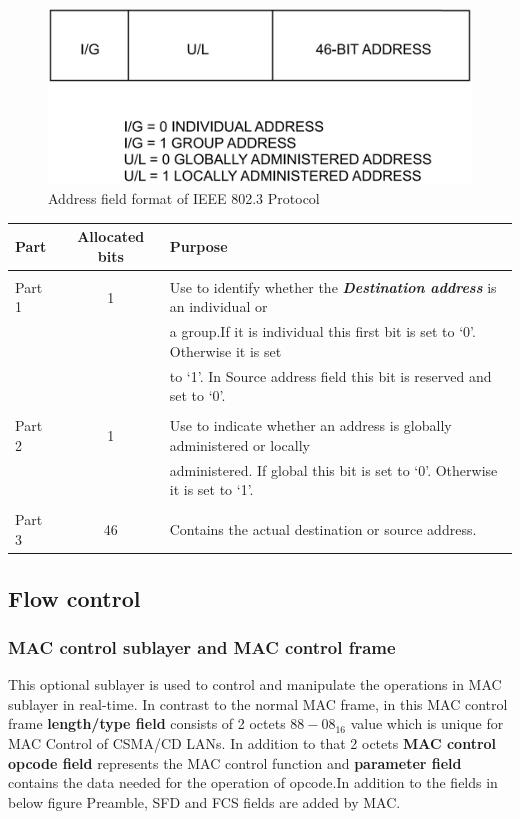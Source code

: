 \documentclass[a4paper,11pt]{article}%
\begin{document}
	\begin{figure}[!h]
		\centering
		\includegraphics[scale=0.2]{figures/addfield}
		\caption{Address field format of IEEE 802.3 Protocol\cite{main}}
	\end{figure}

	\begin{tabular}{l| c |l}
	\textbf{Part}& \textbf{Allocated bits} & \textbf{Purpose}\\ \hline
	&&\\
	  Part 1& 1& Use to identify whether the \textbf{\textit{Destination address}} is an individual or\\ 
	  	& &a group.If it is individual this first bit is set to `0'. Otherwise it is set\\
	  	&&to `1'. In Source address field this bit is reserved and set to `0'.\\
	  &&\\
	  Part 2& 1&Use to indicate whether an address is globally administered or locally\\
	  && administered. If global this bit is set to `0'. Otherwise it is set to `1'.\\
	  
	  &&\\
	  Part 3& 46& Contains the actual destination or source address.\\\hline\hline
\end{tabular}





\subsection{Flow control}

\subsubsection{MAC control sublayer and MAC control frame}
This optional sublayer is used to control and manipulate the operations in MAC sublayer in real-time. In contrast to the normal MAC frame, in this MAC control frame \textbf{length/type field} consists of 2 octets ${88-08}_{16}$ value which is unique for MAC Control of CSMA/CD LANs. In addition to that 2 octets\textbf{ MAC control opcode field} represents the MAC control function and \textbf{parameter field} contains the data needed for the operation of opcode.In addition to the  fields in below figure Preamble, SFD and FCS fields are added by MAC.
\end{document}
